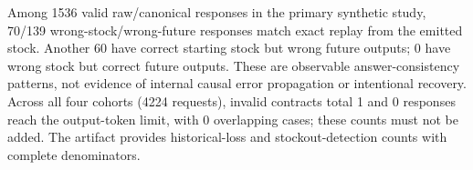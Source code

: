 Among 1536 valid raw/canonical responses in the primary synthetic study, 70/139 wrong-stock/wrong-future responses match exact replay from the emitted stock. Another 60 have correct starting stock but wrong future outputs; 0 have wrong stock but correct future outputs. These are observable answer-consistency patterns, not evidence of internal causal error propagation or intentional recovery. Across all four cohorts (4224 requests), invalid contracts total 1 and 0 responses reach the output-token limit, with 0 overlapping cases; these counts must not be added. The artifact provides historical-loss and stockout-detection counts with complete denominators.
